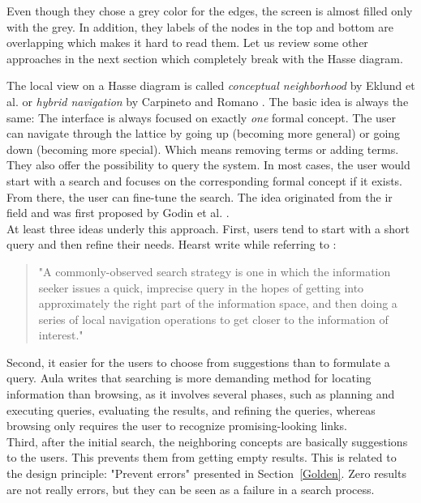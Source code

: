 \documentclass[11pt]{report}
\begin{document}
Even though they chose a grey color for the edges, the screen is almost filled only with the grey. In addition, they labels of the nodes in the top and bottom are overlapping which makes it hard to read them. Let us review some other approaches in the next section which completely break with the Hasse diagram.

The local view on a Hasse diagram is called \textit{conceptual neighborhood} by Eklund et al. \cite{Eklund2009,Eklund2012} or \textit{hybrid navigation} by Carpineto and Romano \cite{Carpineto1996}. The basic idea is always the same: The interface is always focused on exactly \textit{one} formal concept. The user can navigate through the lattice by going up (becoming more general) or going down (becoming more special). Which means removing terms or adding terms. They also offer the possibility to query the system. In most cases, the user would start with a search and focuses on the corresponding formal concept if it exists. From there, the user can fine-tune the search. The idea originated from the \acrshort{ir} field and was first proposed by Godin et al. \cite{Godin1989}. \\

At least three ideas underly this approach. First, users tend to start with a short query and then refine their needs. Hearst \cite{Hearst2009} write  while referring to \cite{Marchionini2006,Bates1990}:
\begin{quote}
	"A commonly-observed search strategy is one in which the information seeker issues a quick, imprecise query in the hopes of getting into approximately the right part of the information space, and then doing a series of local navigation operations to get closer to the information of interest."
\end{quote}

Second, it easier for the users to choose from suggestions than to formulate a query. Aula \cite{Aula2005} writes that searching is more demanding method for locating information than browsing, as it involves several phases, such as planning and executing queries, evaluating the results, and refining the queries, whereas browsing only requires the user to recognize promising-looking links. \\

Third, after the initial search, the neighboring concepts are basically suggestions to the users. This prevents them from getting empty results. This is related to the design principle: "Prevent errors" presented in Section~\ref{Golden}. Zero results are not really errors, but they can be seen as a failure in a search process.\\
\end{document}

